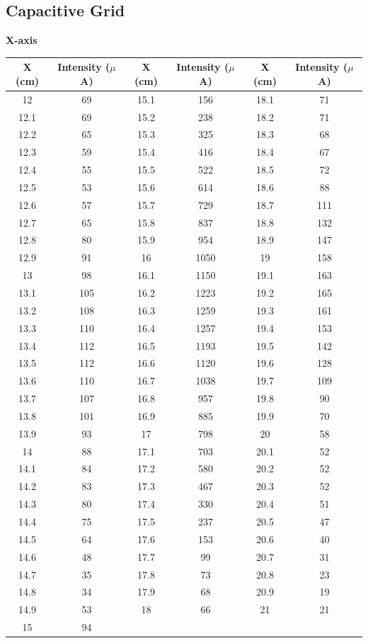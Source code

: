 \documentclass[12pt]{report}
\begin{document}
\subsection{Capacitive Grid}
\textbf{X-axis}
\begin{center}
	\begin{tabular}{ |c|c|c|c|c|c| } 
		\hline
		X (cm) & Intensity ($\mu$A) & X (cm) & Intensity ($\mu$A) & X (cm) & Intensity ($\mu$A) \\ 
		\hline
		12   & 69  & 15.1 & 156  & 18.1 & 71  \\
		12.1 & 69  & 15.2 & 238  & 18.2 & 71  \\
		12.2 & 65  & 15.3 & 325  & 18.3 & 68  \\
		12.3 & 59  & 15.4 & 416  & 18.4 & 67  \\
		12.4 & 55  & 15.5 & 522  & 18.5 & 72  \\
		12.5 & 53  & 15.6 & 614  & 18.6 & 88  \\
		12.6 & 57  & 15.7 & 729  & 18.7 & 111 \\
		12.7 & 65  & 15.8 & 837  & 18.8 & 132 \\
		12.8 & 80  & 15.9 & 954  & 18.9 & 147 \\
		12.9 & 91  & 16   & 1050 & 19   & 158 \\
		13   & 98  & 16.1 & 1150 & 19.1 & 163 \\
		13.1 & 105 & 16.2 & 1223 & 19.2 & 165 \\
		13.2 & 108 & 16.3 & 1259 & 19.3 & 161 \\
		13.3 & 110 & 16.4 & 1257 & 19.4 & 153 \\
		13.4 & 112 & 16.5 & 1193 & 19.5 & 142 \\
		13.5 & 112 & 16.6 & 1120 & 19.6 & 128 \\
		13.6 & 110 & 16.7 & 1038 & 19.7 & 109 \\
		13.7 & 107 & 16.8 & 957  & 19.8 & 90  \\
		13.8 & 101 & 16.9 & 885  & 19.9 & 70  \\
		13.9 & 93  & 17   & 798  & 20   & 58  \\
		14   & 88  & 17.1 & 703  & 20.1 & 52  \\
		14.1 & 84  & 17.2 & 580  & 20.2 & 52  \\
		14.2 & 83  & 17.3 & 467  & 20.3 & 52  \\
		14.3 & 80  & 17.4 & 330  & 20.4 & 51  \\
		14.4 & 75  & 17.5 & 237  & 20.5 & 47  \\
		14.5 & 64  & 17.6 & 153  & 20.6 & 40  \\
		14.6 & 48  & 17.7 & 99   & 20.7 & 31  \\
		14.7 & 35  & 17.8 & 73   & 20.8 & 23  \\
		14.8 & 34  & 17.9 & 68   & 20.9 & 19  \\
		14.9 & 53  & 18   & 66   & 21   & 21  \\
		15   & 94  &      &      &      &     \\
		\hline
	\end{tabular}
	\\
\end{center}
\end{document}
